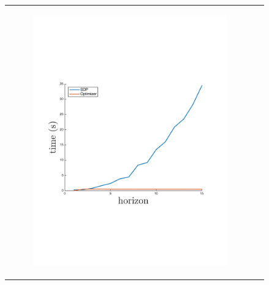 \label{sec:time_space}

    \begin{figure}[ht]
        \begin{tabular}{cc}
            \begin{subfigure}[b]{0.24\textwidth}\centering \includegraphics[width=\textwidth]{images/time_plot_new}
                \label{fig:time_complexity}\end{subfigure}\hspace{-1em}

\end{tabular}
\end{figure}
